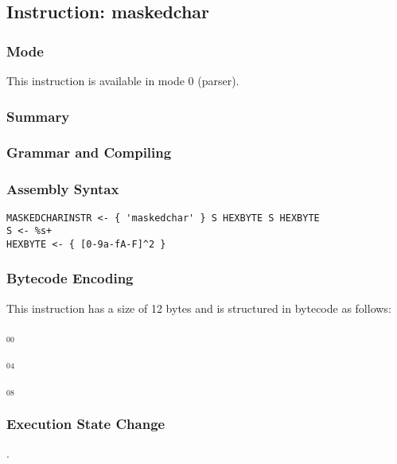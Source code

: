 \subsection{Instruction: maskedchar}

\subsubsection{Mode}
This instruction is available in mode 0 (parser).
\subsubsection{Summary}


\subsubsection{Grammar and Compiling}


\subsubsection{Assembly Syntax}

\begin{myquote}
\begin{verbatim}
MASKEDCHARINSTR <- { 'maskedchar' } S HEXBYTE S HEXBYTE
S <- %s+
HEXBYTE <- { [0-9a-fA-F]^2 }
\end{verbatim}
\end{myquote}

\subsubsection{Bytecode Encoding}

This instruction has a size of 12 bytes and is structured in bytecode as follows:

$_{00}$\ 



$_{04}$\ 



$_{08}$\ 
\fbox{%
  \parbox{20pt}{%
00
  }%
}


\subsubsection{Execution State Change}

.


